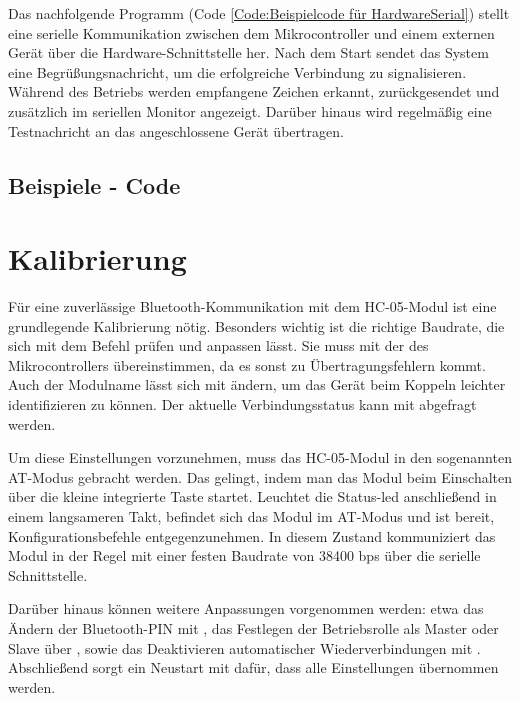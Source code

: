 Das nachfolgende Programm (Code \ref{Code:Beispielcode für HardwareSerial}) stellt eine serielle Kommunikation zwischen dem Mikrocontroller und einem externen Gerät über die Hardware-Schnittstelle  her. Nach dem Start sendet das System eine Begrüßungsnachricht, um die erfolgreiche Verbindung zu signalisieren. Während des Betriebs werden empfangene Zeichen erkannt, zurückgesendet und zusätzlich im seriellen Monitor angezeigt. Darüber hinaus wird regelmäßig eine Testnachricht an das angeschlossene Gerät übertragen.

\subsection{Beispiele - Code}
\begin{center}
	\label{Code:Beispielcode für HardwareSerial}
\end{center}

\section{Kalibrierung}

Für eine zuverlässige Bluetooth-Kommunikation mit dem HC-05-Modul ist eine grundlegende Kalibrierung nötig. Besonders wichtig ist die richtige Baudrate, die sich mit dem Befehl  prüfen und anpassen lässt. Sie muss mit der des Mikrocontrollers übereinstimmen, da es sonst zu Übertragungsfehlern kommt. Auch der Modulname lässt sich mit ändern, um das Gerät beim Koppeln leichter identifizieren zu können. Der aktuelle Verbindungsstatus kann mit  abgefragt werden.

Um diese Einstellungen vorzunehmen, muss das HC-05-Modul in den sogenannten AT-Modus gebracht werden. Das gelingt, indem man das Modul beim Einschalten über die kleine integrierte Taste startet. Leuchtet die Status-\ac{led} anschließend in einem langsameren Takt, befindet sich das Modul im AT-Modus und ist bereit, Konfigurationsbefehle entgegenzunehmen. In diesem Zustand kommuniziert das Modul in der Regel mit einer festen Baudrate von 38400 bps über die serielle Schnittstelle.

Darüber hinaus können weitere  Anpassungen vorgenommen werden: etwa das Ändern der Bluetooth-PIN mit , das Festlegen der Betriebsrolle als Master oder Slave über , sowie das Deaktivieren automatischer Wiederverbindungen mit . Abschließend sorgt ein Neustart mit  dafür, dass alle Einstellungen übernommen werden. \cite{lastminuteengineers:2023} \cite{ITeadStudio:2010}

